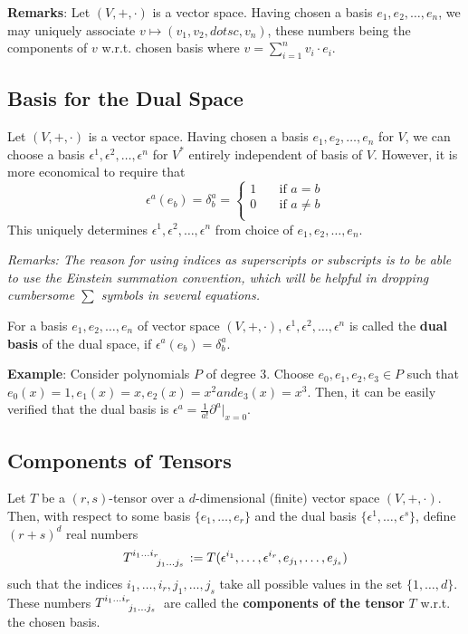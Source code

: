 \textbf{Remarks}: Let $(V,+,\cdot)$ is a vector space. Having chosen a basis $e_1,e_2,\dotsc,e_n$, we may uniquely associate $v \mapsto (v_1,v_2,dotsc,v_n)$, these numbers being the components of $v$ w.r.t. chosen basis where $v = \displaystyle\sum_{i=1}^n v_i \cdot e_i$.

\subsection{Basis for the Dual Space}
Let $(V,+,\cdot)$ is a vector space. Having chosen a basis $e_1,e_2,\dotsc,e_n$ for $V$, we can choose a basis $\epsilon^1,\epsilon^2,\dotsc,\epsilon^n$ for $V^\ast$ entirely independent of basis of $V$. However, it is more economical to require that
\begin{equation*}
\epsilon^a (e_b) = \delta_b^a = \begin{cases}
1 &\quad \text{if } a = b \\
0 &\quad \text{if } a \neq b \\
\end{cases}
\end{equation*} This uniquely determines $\epsilon^1,\epsilon^2,\dotsc,\epsilon^n$ from choice of $e_1,e_2,\dotsc,e_n$.

\textit{Remarks: The reason for using indices as superscripts or subscripts is to be able to use the Einstein summation convention, which will be helpful in dropping cumbersome $\sum$ symbols in several equations.}

\begin{definition}
For a basis $e_1,e_2,\dotsc,e_n$ of vector space $(V,+,\cdot)$, $\epsilon^1,\epsilon^2,\dotsc,\epsilon^n$ is called the \textbf{dual basis} of the dual space, if $\epsilon^a (e_b) = \delta_b^a$.
\end{definition}

\textbf{Example}: Consider polynomials $P$ of degree 3. Choose $e_0,e_1,e_2,e_3 \in P$ such that $e_0(x) = 1, e_1(x) = x, e_2(x) = x^2 and e_3(x) = x^3$. Then, it can be easily verified that the dual basis is $\epsilon^a = \displaystyle\frac{1}{a!}\partial^a\Big|_{x=0}$.

\subsection{Components of Tensors}
\begin{definition}
Let $T$ be a $(r,s)$-tensor over a $d$-dimensional (finite) vector space $(V,+,\cdot)$. Then, with respect to some basis $\lbrace e_1, \dotsc, e_r \rbrace$ and the dual basis $\lbrace \epsilon^1, \dotsc, \epsilon^s \rbrace$, define $(r+s)^d$ real numbers
\begin{equation*}
T\indices{^{i_1 \dots i_r}_{j_1 \dots j_s}} := T(\epsilon^{i_1}, \dotsc, \epsilon^{i_r}, e_{j_1}, \dotsc, e_{j_s})
\end{equation*} such that the indices $i_1, \dotsc, i_r, j_1, \dotsc, j_s$ take all possible values in the set $\lbrace 1,\dotsc,d \rbrace$. These numbers $T\indices{^{i_1 \dots i_r}_{j_1 \dots j_s}}$ are called the \textbf{components of the tensor} $T$ w.r.t. the chosen basis.
\end{definition}

